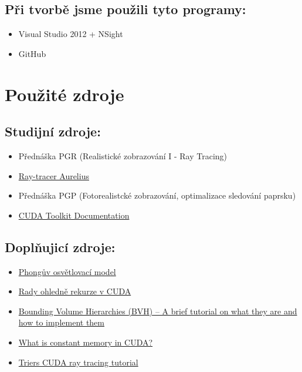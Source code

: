 \documentclass[12pt,a4paper,titlepage,final]{report}
\begin{document}
\subsection{Při tvorbě jsme použili tyto programy:}
\begin{itemize}
	\item Visual Studio 2012 + NSight
	\item GitHub
\end{itemize}
\section{Použité zdroje}

\subsection{Studijní zdroje:}
\begin{itemize}
	\item Přednáška PGR (Realistické zobrazování I - Ray Tracing)
	\item \href{https://www.fit.vutbr.cz/study/courses/PGR/private/Aurelius.zip}{Ray-tracer Aurelius}
	\item Přednáška PGP (Fotorealistcké zobrazování, optimalizace sledování paprsku)
	\item \href{http://docs.nvidia.com/cuda}{CUDA Toolkit Documentation}
\end{itemize}

\subsection{Doplňujicí zdroje:}
\begin{itemize}
	\item \href{http://cs.wikipedia.org/wiki/Phong%C5%AFv_osv%C4%9Btlovac%C3%AD_model}{Phongův osvětlovací model}
	\item \href{http://stackoverflow.com/questions/19013156/how-does-cuda-4-0-support-recursion}{Rady ohledně rekurze v CUDA}
	\item \href{http://www.3dmuve.com/3dmblog/?p=182}{Bounding Volume Hierarchies (BVH) – A brief tutorial on what they are and how to implement them}
	\item \href{http://cuda-programming.blogspot.cz/2013/01/what-is-constant-memory-in-cuda.html}{What is constant memory in CUDA?}
	\item \href{http://cg.alexandra.dk/2009/08/10/triers-cuda-ray-tracing-tutorial/}{Triers CUDA ray tracing tutorial}
\end{itemize}
\end{document}
